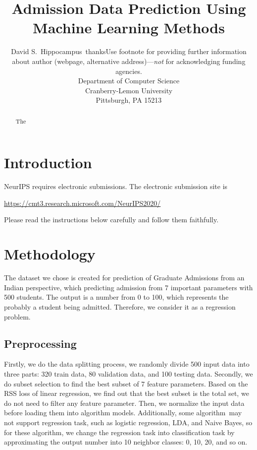 \documentclass{article}
\title{Admission Data Prediction Using Machine Learning Methods}
\author{
  David S.~Hippocampus\   thanks{Use footnote for providing further information
    about author (webpage, alternative address)---\emph{not} for acknowledging
    funding agencies.} \\
  Department of Computer Science\\
  Cranberry-Lemon University\\
  Pittsburgh, PA 15213 \\
}
\begin{document}
\maketitle

\begin{abstract}
  The 
\end{abstract}

\section{Introduction}

NeurIPS requires electronic submissions.  The electronic submission site is
\begin{center}
  \url{https://cmt3.research.microsoft.com/NeurIPS2020/}
\end{center}

Please read the instructions below carefully and follow them faithfully.

















\section{Methodology}
\label{gen_inst}
The dataset we chose is created for prediction of Graduate Admissions from an Indian perspective, which predicting admission from 7 important parameters with 500 students. The output is a number from 0 to 100, which represents the probably a student being admitted. Therefore, we consider it as a regression problem.

\subsection{Preprocessing}
Firstly, we do the data splitting process, we randomly divide 500 input data into three parts: 320 train data, 80 validation data, and 100 testing data.
Secondly, we do subset selection to find the best subset of 7 feature parameters. Based on the RSS loss of linear regression, we find out that the best subset is the total set, we do not need to filter any feature parameter.
Then, we normalize the input data before loading them into algorithm models.
Additionally, some algorithm may not support regression task, such as logistic regression, LDA, and Naive Bayes, so for these algorithm, we change the regression task into classification task by approximating the output number into 10 neighbor classes: 0, 10, 20, and so on.
\end{document}
